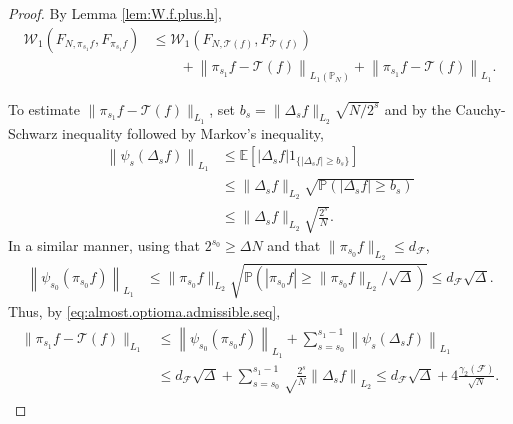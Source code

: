 \documentclass[11pt]{amsart}
\newcommand{\W}{\mathcal{W}}
\theoremstyle{definition}
\newcommand{\E}{\mathbb{E}}
\renewcommand{\P}{\mathbb{P}}
\numberwithin{equation}{section}
\begin{document}
\begin{proof}
By Lemma \ref{lem:W.f.plus.h},
\begin{align*}
 \W_{1}(F_{N,\pi_{s_{1}}f}, F_{\pi_{s_{1}}f}) 
&\leq \W_{1}(F_{N,\mathcal{T}(f)}, F_{\mathcal{T}(f)} ) \\
&\qquad + \left\| \pi_{s_1}f- \mathcal{T}(f) \right\|_{L_{1}(\P_N )} + \left\|\pi_{s_1} f-\mathcal{T}(f)\right\|_{L_{1}}.
\end{align*}

To estimate $\|\pi_{s_1}f-\mathcal{T}(f) \|_{L_{1}}$, set $b_{s}= \|\Delta_{s} f\|_{L_{2}}\sqrt{N/2^s}$ and by the  Cauchy-Schwarz inequality followed by  Markov's inequality,
\begin{align*}
 \left\| \psi_{s}(\Delta_{s}f) \right\|_{L_{1}}
&\leq\E\left[ |\Delta_{s} f | 1_{\{ |\Delta_{s} f |\geq b_{s} \} } \right] \\
&\leq \|\Delta_{s} f \|_{L_{2}} \sqrt{ \P( |\Delta_{s} f |\geq b_{s}) }  \\
&\leq \|\Delta_{s} f \|_{L_{2}} \sqrt{ \frac{2^{s}}{N} }.
\end{align*}
In a similar manner, using that $2^{s_{0}}\geq  \Delta N$ and that $\|\pi_{s_{0}} f\|_{L_{2}}\leq d_{\mathcal{F}} $,
\begin{align*}
 \left\| \psi_{s_{0}}(\pi_{s_{0}}f) \right\|_{L_{1}}
&\leq \| \pi_{s_{0}} f \|_{L_{2}} \sqrt{ \P( |\pi_{s_{0}} f |\geq \|\pi_{s_{0}} f\|_{L_{2}}/\sqrt{\Delta}) }  
\leq   d_{\mathcal{F}}  \sqrt\Delta.
\end{align*}
Thus, by \eqref{eq:almost.optioma.admissible.seq},
\begin{align}
\label{eq:pi.s1.vs.T.some.eq}
\begin{split}
\| \pi_{s_1} f-\mathcal{T}(f) \|_{L_{1}}
&\leq \left\| \psi_{s_{0}}(\pi_{s_{0}}f) \right\|_{L_{1}} + \sum_{s=s_{0}}^{s_{1}-1} \left\| \psi_{s}(\Delta_{s}f) \right\|_{L_{1}}\\
&\leq  d_{\mathcal{F}} \sqrt\Delta  + \sum_{s=s_{0}}^{s_{1}-1}  \sqrt\frac{2^{s}}{N} \left\|\Delta_{s}f \right\|_{L_{2}}
\leq d_{\mathcal{F}}  \sqrt\Delta  + 4 \frac{\gamma_{2}(\mathcal{F})}{\sqrt N}.
\end{split}
\end{align}



\end{proof}
\end{document}

